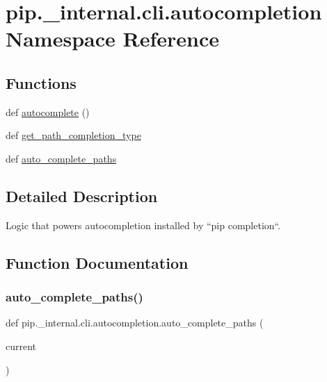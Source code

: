 \hypertarget{namespacepip_1_1__internal_1_1cli_1_1autocompletion}{}\section{pip.\+\_\+internal.\+cli.\+autocompletion Namespace Reference}
\label{namespacepip_1_1__internal_1_1cli_1_1autocompletion}
\subsection*{Functions}
\begin{DoxyCompactItemize}
\item 
def \hyperlink{namespacepip_1_1__internal_1_1cli_1_1autocompletion_ab676b40a63ace810224c1cce7586acf0}{autocomplete} ()
\item 
def \hyperlink{namespacepip_1_1__internal_1_1cli_1_1autocompletion_af76c7be7a7d0b0250ae5407ef211170e}{get\+\_\+path\+\_\+completion\+\_\+type}
\item 
def \hyperlink{namespacepip_1_1__internal_1_1cli_1_1autocompletion_a7e393d308485ca4693d66790728fbca2}{auto\+\_\+complete\+\_\+paths}
\end{DoxyCompactItemize}


\subsection{Detailed Description}
\begin{DoxyVerb}Logic that powers autocompletion installed by ``pip completion``.
\end{DoxyVerb}
 

\subsection{Function Documentation}
\mbox{\label{namespacepip_1_1__internal_1_1cli_1_1autocompletion_a7e393d308485ca4693d66790728fbca2}} 
\subsubsection{\texorpdfstring{auto\+\_\+complete\+\_\+paths()}{auto\_complete\_paths()}}
{\footnotesize\ttfamily def pip.\+\_\+internal.\+cli.\+autocompletion.\+auto\+\_\+complete\+\_\+paths (\begin{DoxyParamCaption}\item[{}]{current }\end{DoxyParamCaption})}

